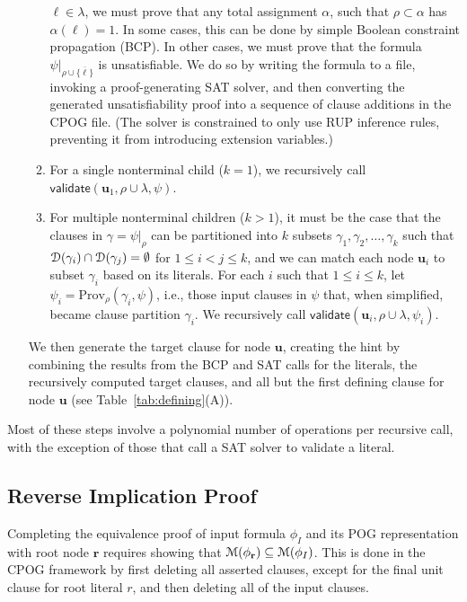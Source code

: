 \documentclass[letterpaper,USenglish,cleveref, autoref, thm-restate]{lipics-v2021}
\newcommand{\obar}[1]{\overline{#1}}
\newcommand{\lit}{\ell}
\newcommand{\dependencyset}{{\cal D}}
\newcommand{\imply}{\Rightarrow}
\newcommand{\passign}{\rho}
\newcommand{\modelset}{{\cal M}}
\newcommand{\validate}{\textsf{validate}}
\newcommand{\prov}{\textrm{Prov}}
\newcommand{\inputformula}{\phi_I}
\newcommand{\makenode}[1]{\mathbf{#1}}
\newcommand{\nodeu}{\makenode{u}}
\newcommand{\noder}{\makenode{r}}
\newcommand{\simplify}[2]{#1|_{#2}}
\begin{document}
\begin{enumerate}
\begin{enumerate}
  $\lit \in \lambda$, we must prove that any total assignment $\alpha$, such that
  $\passign \subset \alpha$ has $\alpha(\lit) = 1$.  In some
  cases, this can be done by simple Boolean constraint propagation (BCP).
  In other cases, we must prove that the formula
  $\simplify{\psi}{\passign \cup \{\obar{\lit}\}}$ is unsatisfiable.  We
  do so by writing the formula to a file, invoking a proof-generating
  SAT solver, and then converting the generated unsatisfiability proof
  into a sequence of clause additions in the CPOG file.
  (The solver is constrained to only use RUP inference rules, preventing it from introducing extension variables.)
\item For a single nonterminal child ($k = 1$), we recursively call
  $\validate \left(\nodeu_1, \passign \cup \lambda, \psi\right)$.
\item For multiple nonterminal children ($k > 1$),
  it must be the case that the clauses in
  $\gamma = \simplify{\psi}{\passign}$ can be partitioned into $k$ subsets
  $\gamma_1, \gamma_2, \ldots, \gamma_k$ such that $\dependencyset(\gamma_i)
  \cap \dependencyset(\gamma_j) = \emptyset$ for $1 \leq i < j \leq k$,
  and we can match each node $\nodeu_i$ to subset $\gamma_i$ based on its
  literals.
  For each $i$ such that $1 \leq i \leq k$, let $\psi_i = \prov_{\passign}(\gamma_i, \psi)$, i.e., those input clauses in $\psi$ that, when simplified, became clause partition $\gamma_i$.
  We recursively call
  $\validate \left(\nodeu_i, \passign \cup \lambda, \psi_i\right)$.
\end{enumerate}
  We then generate the target clause for node $\nodeu$,
creating the hint by combining the results from the BCP and SAT calls for
  the literals, the recursively computed target clauses, and all but
  the first defining clause for node $\nodeu$
(see Table~\ref{tab:defining}(A)).
\end{enumerate}
Most of these steps involve a polynomial number of
operations per recursive call, with the exception of those that call
a SAT solver to validate a literal.

\subsection{Reverse Implication Proof}

Completing the equivalence proof of input formula $\inputformula$ and its POG
representation with root node $\noder$ requires showing that
$\modelset(\phi_\noder) \subseteq \modelset(\inputformula)$.  This is done in the
CPOG framework by first deleting all asserted clauses, except for the
final unit clause for root literal $r$, and then deleting all of the
input clauses.
\end{document}
